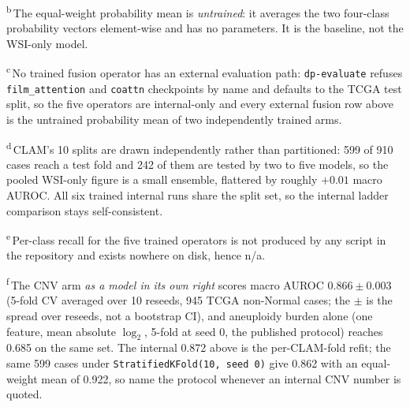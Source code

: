 \begin{table}[htbp]
\begin{minipage}{\linewidth}
\textsuperscript{b}\,The equal-weight probability mean is \emph{untrained}: it averages the two
four-class probability vectors element-wise and has no parameters. It is the baseline, not the
WSI-only model.

\textsuperscript{c}\,No trained fusion operator has an external evaluation path: \texttt{dp-evaluate}
refuses \texttt{film\_attention} and \texttt{coattn} checkpoints by name and defaults to the TCGA
test split, so the five operators are internal-only and every external fusion row above is the
untrained probability mean of two independently trained arms.

\textsuperscript{d}\,CLAM's 10 splits are drawn independently rather than partitioned: 599 of 910
cases reach a test fold and 242 of them are tested by two to five models, so the pooled WSI-only
figure is a small ensemble, flattered by roughly $+0.01$ macro AUROC. All six trained internal
runs share the split set, so the internal ladder comparison stays self-consistent.

\textsuperscript{e}\,Per-class recall for the five trained operators is not produced by any script
in the repository and exists nowhere on disk, hence n/a.

\textsuperscript{f}\,The CNV arm \emph{as a model in its own right} scores macro AUROC
$0.866 \pm 0.003$ (5-fold CV averaged over 10 reseeds, 945 TCGA non-Normal cases; the $\pm$ is the
spread over reseeds, not a bootstrap CI), and aneuploidy burden alone (one feature, mean absolute
$\log_2$, 5-fold at seed 0, the published protocol) reaches 0.685 on the same set. The internal
0.872 above is the per-CLAM-fold refit; the same 599 cases under
\texttt{StratifiedKFold(10, seed 0)} give 0.862 with an equal-weight mean of 0.922, so name the
protocol whenever an internal CNV number is quoted.
\end{minipage}
\end{table}
